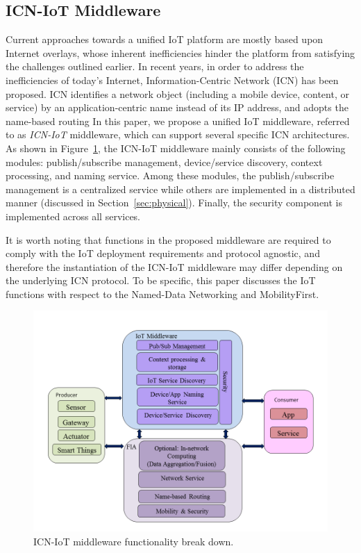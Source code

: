 \subsection{ICN-IoT Middleware}
Current approaches towards a unified IoT platform are mostly based upon Internet overlays, whose inherent inefficiencies hinder the platform from satisfying the challenges outlined earlier. In recent years, in order to address  the inefficiencies of today's Internet, Information-Centric Network (ICN) has been proposed. ICN identifies a network object (including a mobile device, content, or service) by an application-centric name instead of its IP address, and adopts the name-based routing
In this paper, we propose a unified IoT middleware, referred to as \emph{ICN-IoT} middleware, which can support several specific ICN architectures. As shown in Figure~\ref{fig:mid_arch}, the ICN-IoT middleware mainly consists of the following modules: publish/subscribe management, device/service discovery, context processing, and naming service. Among these modules, the publish/subscribe management is a centralized service while others are implemented in a distributed manner (discussed in Section~\ref{sec:physical}). Finally, the security component is implemented across all services.

It is worth noting that functions in the proposed middleware are required to comply with the IoT deployment requirements and protocol agnostic, and therefore the instantiation of the ICN-IoT middleware may differ depending on the underlying ICN protocol. To be specific, this paper discusses the IoT functions with respect to the Named-Data Networking and  MobilityFirst.
\begin{figure}
\centering
\includegraphics[width=\columnwidth]{figure/middleware_architecture.png}
\caption{\label{fig:mid_arch} ICN-IoT middleware functionality break down.}
\end{figure}
